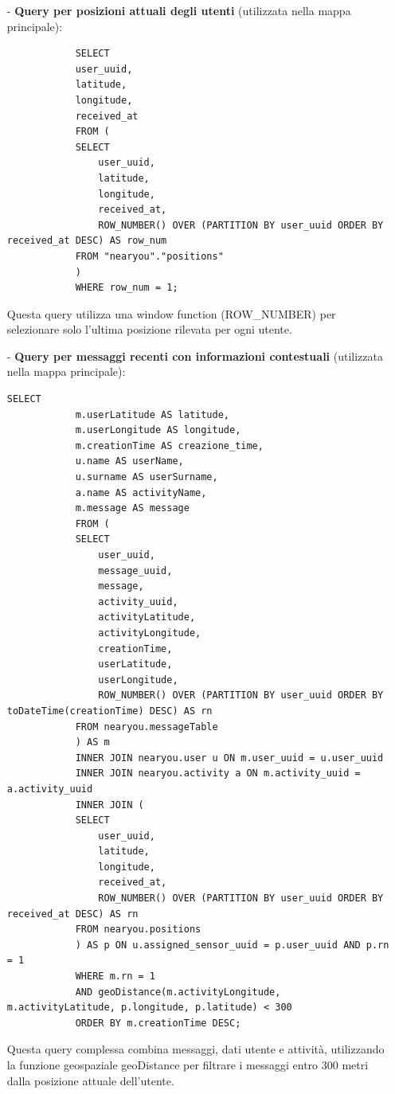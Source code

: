 \documentclass[10pt]{article}
\begin{document}
        \begin{itemize}
            \item[-] \textbf{Query per posizioni attuali degli utenti} (utilizzata nella mappa principale):
            \begin{lstlisting}
            SELECT
            user_uuid,
            latitude,
            longitude,
            received_at
            FROM (
            SELECT
                user_uuid,
                latitude,
                longitude,
                received_at,
                ROW_NUMBER() OVER (PARTITION BY user_uuid ORDER BY received_at DESC) AS row_num
            FROM "nearyou"."positions"
            )
            WHERE row_num = 1;
            \end{lstlisting}
            Questa query utilizza una window function (ROW\_NUMBER) per selezionare solo l'ultima posizione rilevata per ogni utente.

            \item[-] \textbf{Query per messaggi recenti con informazioni contestuali} (utilizzata nella mappa principale):
            \begin{lstlisting}[basicstyle=\ttfamily\footnotesize]
            SELECT
            m.userLatitude AS latitude,
            m.userLongitude AS longitude,
            m.creationTime AS creazione_time,
            u.name AS userName,
            u.surname AS userSurname,
            a.name AS activityName,
            m.message AS message
            FROM (
            SELECT
                user_uuid,
                message_uuid,
                message,
                activity_uuid,
                activityLatitude,
                activityLongitude,
                creationTime,
                userLatitude,
                userLongitude,
                ROW_NUMBER() OVER (PARTITION BY user_uuid ORDER BY toDateTime(creationTime) DESC) AS rn
            FROM nearyou.messageTable
            ) AS m
            INNER JOIN nearyou.user u ON m.user_uuid = u.user_uuid
            INNER JOIN nearyou.activity a ON m.activity_uuid = a.activity_uuid
            INNER JOIN (
            SELECT
                user_uuid,
                latitude,
                longitude,
                received_at,
                ROW_NUMBER() OVER (PARTITION BY user_uuid ORDER BY received_at DESC) AS rn
            FROM nearyou.positions
            ) AS p ON u.assigned_sensor_uuid = p.user_uuid AND p.rn = 1
            WHERE m.rn = 1
            AND geoDistance(m.activityLongitude, m.activityLatitude, p.longitude, p.latitude) < 300
            ORDER BY m.creationTime DESC;
            \end{lstlisting}
            Questa query complessa combina messaggi, dati utente e attività, utilizzando la funzione geospaziale geoDistance per filtrare i messaggi entro 300 metri dalla posizione attuale dell'utente.


\end{itemize}
\end{document}
